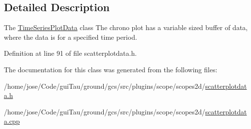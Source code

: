 \subsection{Detailed Description}
The \hyperlink{class_time_series_plot_data}{Time\-Series\-Plot\-Data} class The chrono plot has a variable sized buffer of data, where the data is for a specified time period. 

Definition at line 91 of file scatterplotdata.\-h.



The documentation for this class was generated from the following files\-:\begin{DoxyCompactItemize}
\item 
/home/jose/\-Code/gui\-Tau/ground/gcs/src/plugins/scope/scopes2d/\hyperlink{scatterplotdata_8h}{scatterplotdata.\-h}\item 
/home/jose/\-Code/gui\-Tau/ground/gcs/src/plugins/scope/scopes2d/\hyperlink{scatterplotdata_8cpp}{scatterplotdata.\-cpp}\end{DoxyCompactItemize}
